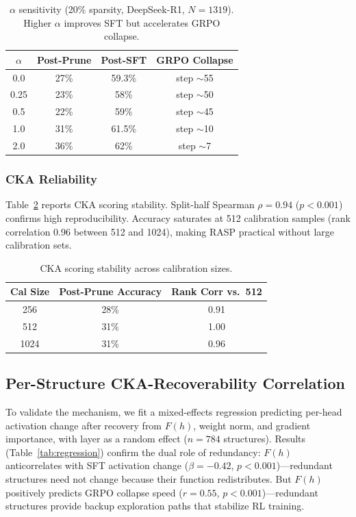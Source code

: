 \documentclass[11pt]{article}
\begin{document}
\begin{table}[t]
\centering
\caption{$\alpha$ sensitivity (20\% sparsity, DeepSeek-R1, $N{=}1319$). Higher $\alpha$ improves SFT but accelerates GRPO collapse.}
\label{tab:alpha}
\begin{tabular}{cccc}
\toprule
$\alpha$ & \textbf{Post-Prune} & \textbf{Post-SFT} & \textbf{GRPO Collapse} \\
\midrule
0.0  & 27\% & 59.3\% & step ${\sim}$55 \\
0.25 & 23\% & 58\%   & step ${\sim}$50 \\
0.5  & 22\% & 59\%   & step ${\sim}$45 \\
1.0  & 31\% & 61.5\% & step ${\sim}$10 \\
2.0  & 36\% & 62\%   & step ${\sim}$7 \\
\bottomrule
\end{tabular}
\end{table}

\subsubsection{CKA Reliability}

Table~\ref{tab:cka_stability} reports CKA scoring stability.
Split-half Spearman $\rho{=}0.94$ ($p{<}0.001$) confirms high reproducibility.
Accuracy saturates at 512 calibration samples (rank correlation 0.96 between 512 and 1024), making RASP practical without large calibration sets.

\begin{table}[t]
\centering
\caption{CKA scoring stability across calibration sizes.}
\label{tab:cka_stability}
\begin{tabular}{ccc}
\toprule
\textbf{Cal Size} & \textbf{Post-Prune Accuracy} & \textbf{Rank Corr vs.\ 512} \\
\midrule
256  & 28\% & 0.91 \\
512  & 31\% & 1.00 \\
1024 & 31\% & 0.96 \\
\bottomrule
\end{tabular}
\end{table}

\subsection{Per-Structure CKA-Recoverability Correlation}
\label{sec:correlation}

To validate the mechanism, we fit a mixed-effects regression predicting per-head activation change after recovery from $F(h)$, weight norm, and gradient importance, with layer as a random effect ($n{=}784$ structures).
Results (Table~\ref{tab:regression}) confirm the dual role of redundancy:
$F(h)$ anticorrelates with SFT activation change ($\beta{=}{-}0.42$, $p{<}0.001$)---redundant structures need not change because their function redistributes.
But $F(h)$ positively predicts GRPO collapse speed ($r{=}0.55$, $p{<}0.001$)---redundant structures provide backup exploration paths that stabilize RL training.
\end{document}

